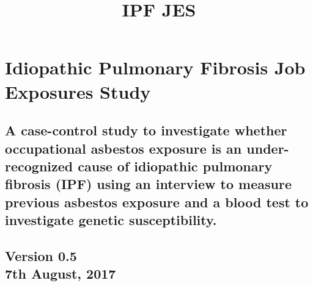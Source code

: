 \documentclass[a4paper,10pt]{article}
\title{\bf IPF JES}
\date{}
\begin{document}
\pagestyle{fancy} 


\maketitle



\section*{Idiopathic Pulmonary Fibrosis Job Exposures Study}
 \subsection*{A case-control study to investigate whether occupational asbestos exposure is an under-recognized cause of idiopathic pulmonary fibrosis (IPF) using an interview to measure previous
asbestos exposure and a blood test to investigate genetic susceptibility.}


\begin{centering}
\subsection*{Version 0.5 \\ 7th August, 2017}
\end{centering}
\end{document}
